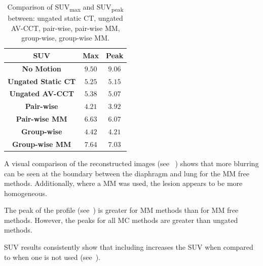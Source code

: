     \begin{table}
        \centering
        
        \captionsetup{singlelinecheck=false, justification=centering}
        \caption{Comparison of \gls{SUV}\textsubscript{max} and \gls{SUV}\textsubscript{peak} between: ungated static \gls{CT}, ungated \gls{AV-CCT}, pair-wise, pair-wise \gls{MM}, group-wise, group-wise \gls{MM}.}
        
        \resizebox*{1.0\linewidth}{!}
        {
            \begin{tabular}{||c|cc||}
                \hline
                \textbf{\gls{SUV}}                  & \textbf{Max}  & \textbf{Peak} \\
                \hline
                \textbf{No Motion}                  & $9.50$        & $9.06$ \\
                \hline
                \textbf{Ungated Static \gls{CT}}    & $5.25$        & $5.15$ \\
                \textbf{Ungated \gls{AV-CCT}}       & $5.38$        & $5.07$ \\
                \hline
                \textbf{Pair-wise}                  & $4.21$        & $3.92$ \\
                \textbf{Pair-wise \gls{MM}}         & $6.63$        & $6.07$ \\
                \hline
                \textbf{Group-wise}                 & $4.42$        & $4.21$ \\
                \textbf{Group-wise \gls{MM}}        & $7.64$        & $7.03$ \\
                \hline
            \end{tabular}
        }
        \label{tab:suv}
        
    \end{table}
    
    A visual comparison of the reconstructed images (see ~) shows that more blurring can be seen at the boundary between the diaphragm and lung for the \gls{MM} free methods. Additionally, where a \gls{MM} was used, the lesion appears to be more homogeneous.
     
    The peak of the profile (see~) is greater for \gls{MM} methods than for \gls{MM} free methods. However, the peaks for all \gls{MC} methods are greater than ungated methods.
     
    \gls{SUV} results consistently show that including  increases the \gls{SUV} when compared to when one is not used (see~).

